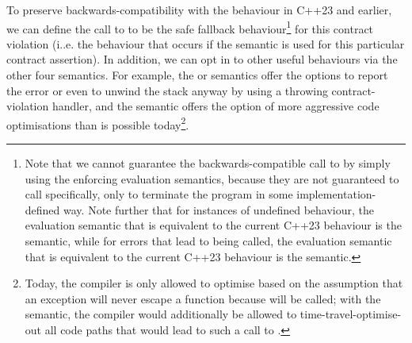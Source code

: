 To preserve backwards-compatibility with the behaviour in C++23 and earlier, we can define the call to  to be the safe fallback behaviour\footnote{Note that we cannot guarantee the backwards-compatible call to  by simply using the enforcing evaluation semantics, because they are not guaranteed to call  specifically, only to terminate the program in some implementation-defined way. Note further that for instances of undefined behaviour, the evaluation semantic that is equivalent to the current C++23 behaviour is the  semantic, while for errors that lead to  being called, the evaluation semantic that is equivalent to the current C++23 behaviour is the  semantic.} for this contract violation (i..e. the behaviour that occurs if the  semantic is used for this particular contract assertion). In addition, we can opt in to other useful behaviours via the other four semantics. For example, the  or  semantics offer the options to report the error or even to unwind the stack anyway by using a throwing contract-violation handler, and the  semantic offers the option of more aggressive code optimisations than is possible today\footnote{Today, the compiler is only allowed to optimise based on the assumption that an exception will never escape a  function because  will be called; with the  semantic, the compiler would additionally be allowed to time-travel-optimise-out all code paths that would lead to such a call to .}.





\pagebreak %

\renewcommand{\bibname}{References}




